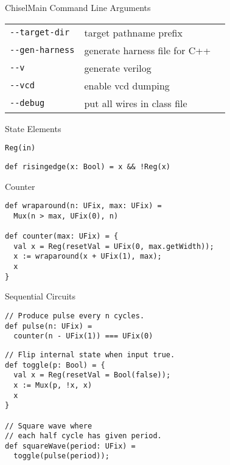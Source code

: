 \documentclass[xcolor=pdflatex,dvipsnames,table]{beamer}
\begin{document}
\begin{frame}[fragile]{ChiselMain Command Line Arguments}
\begin{tabular}{lll}
\verb+--target-dir+ & target pathname prefix \\
\verb+--gen-harness+ & generate harness file for C++ \\
\verb+--v+ & generate verilog \\
\verb+--vcd+ & enable vcd dumping \\
\verb+--debug+ & put all wires in class file \\
\end{tabular}
\end{frame}


\begin{frame}[fragile]{State Elements}

\begin{lstlisting}
Reg(in)
\end{lstlisting}

\begin{lstlisting}
def risingedge(x: Bool) = x && !Reg(x)
\end{lstlisting}

\end{frame}

\begin{frame}[fragile]{Counter}

\begin{lstlisting}
def wraparound(n: UFix, max: UFix) =
  Mux(n > max, UFix(0), n)

def counter(max: UFix) = {
  val x = Reg(resetVal = UFix(0, max.getWidth));
  x := wraparound(x + UFix(1), max);
  x
}
\end{lstlisting}

\end{frame}

\begin{frame}[fragile]{Sequential Circuits}

\begin{lstlisting}
// Produce pulse every n cycles.
def pulse(n: UFix) = 
  counter(n - UFix(1)) === UFix(0)
\end{lstlisting}

\begin{lstlisting}
// Flip internal state when input true.
def toggle(p: Bool) = {
  val x = Reg(resetVal = Bool(false));
  x := Mux(p, !x, x)
  x
}

// Square wave where 
// each half cycle has given period.
def squareWave(period: UFix) = 
  toggle(pulse(period));
\end{lstlisting}

\end{frame}
\end{document}
